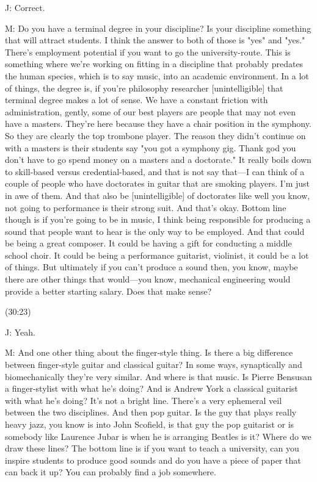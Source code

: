\documentclass[11pt]{article}
\begin{document}
J: Correct.

M: Do you have a terminal degree in your discipline? Is your discipline something that will attract students. I think the answer to both of those is "yes" and "yes." There's employment potential if you want to go the university-route. This is something where we're working on fitting in a discipline that probably predates the human species, which is to say music, into an academic environment. In a lot of things, the degree is, if you're philosophy researcher [unintelligible] that terminal degree makes a lot of sense. We have a constant friction with administration, gently, some of our best players are people that may not even have a masters. They're here because they have a chair position in the symphony. So they are clearly the top trombone player. The reason they didn't continue on with a masters is their students say "you got a symphony gig. Thank god you don't have to go spend money on a masters and a doctorate." It really boils down to skill-based versus credential-based, and that is not say that—I can think of a couple of people who have doctorates in guitar that are smoking players. I'm just in awe of them. And that also be [unintelligible] of doctorates like well you know, not going to performance is their strong suit. And that's okay. Bottom line though is if you're going to be in music, I think being responsible for producing a sound that people want to hear is the only way to be employed. And that could be being a great composer. It could be having a gift for conducting a middle school choir. It could be being a performance guitarist, violinist, it could be a lot of things. But ultimately if you can't produce a sound then, you know, maybe there are other things that would—you know, mechanical engineering would provide a better starting salary. Does that make sense?

(30:23)

J: Yeah. 

M: And one other thing about the finger-style thing. Is there a big difference between finger-style guitar and classical guitar? In some ways, synaptically and biomechanically they're very similar. And where is that music. Is Pierre Bensusan a finger-stylist with what he's doing? And is Andrew York a classical guitarist with what he's doing? It's not a bright line. There's a very ephemeral veil between the two disciplines. And then pop guitar. Is the guy that plays really heavy jazz, you know is into John Scofield, is that guy the pop guitarist or is somebody like Laurence Jubar is when he is arranging Beatles is it? Where do we draw these lines? The bottom line is if you want to teach a university, can you inspire students to produce good sounds and do you have a piece of paper that can back it up? You can probably find a job somewhere.
\end{document}
